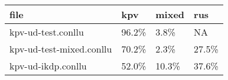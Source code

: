 
\begin{tabular}{l|l|l|l}
\hline
file & kpv & mixed & rus\\
\hline
kpv-ud-test.conllu & 96.2\% & 3.8\% & NA\\
\hline
kpv-ud-test-mixed.conllu & 70.2\% & 2.3\% & 27.5\%\\
\hline
kpv-ud-ikdp.conllu & 52.0\% & 10.3\% & 37.6\%\\
\hline
\end{tabular}

